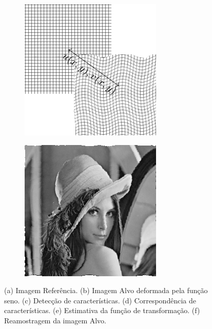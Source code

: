 \begin{figure}[H]
\begin{subfigure}[t]{0.3\textwidth}
      \includegraphics[width=\textwidth]{figuras/estimativa.png}
      \label{fig:estimativa}
    \end{subfigure} 
    \begin{subfigure}[t]{0.3\textwidth}
      \includegraphics[width=\textwidth]{figuras/lenaRegistrada.png}
      \label{fig:lenaRegistrada}
    \end{subfigure}
    \caption{(a) Imagem Referência. (b) Imagem Alvo deformada pela função seno. 
             (c) Detecção de características. (d) Correspondência de características.
             (e) Estimativa da função de transformação. (f) Reamostragem da imagem Alvo.}
    \label{fig:regExplicacao}
\end{figure}


